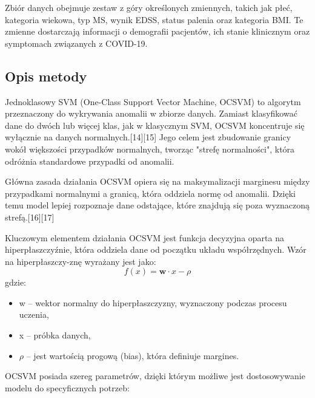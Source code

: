 \documentclass[a4paper,fleqn]{cas-dc}
\begin{document}
Zbiór danych obejmuje zestaw z góry określonych zmiennych, takich jak płeć, kategoria wiekowa, typ MS, wynik EDSS, status palenia oraz kategoria BMI. Te zmienne dostarczają informacji o demografii pacjentów, ich stanie klinicznym oraz symptomach związanych z COVID-19. 

\subsection{Opis metody}
Jednoklasowy SVM (One-Class Support Vector Machine, OCSVM) to algorytm przeznaczony do wykrywania anomalii w zbiorze danych. Zamiast klasyfikować dane do dwóch lub więcej klas, jak w klasycznym SVM, OCSVM koncentruje się wyłącznie na danych normalnych.[14][15] Jego celem jest zbudowanie granicy wokół większości przypadków normalnych, tworząc "strefę normalności", która odróżnia standardowe przypadki od anomalii.

Główna zasada działania OCSVM opiera się na maksymalizacji marginesu między przypadkami normalnymi a granicą, która oddziela normę od anomalii. Dzięki temu model lepiej rozpoznaje dane odstające, które znajdują się poza wyznaczoną strefą.[16][17]

Kluczowym elementem działania OCSVM jest funkcja decyzyjna oparta na hiperpłaszczyźnie, która oddziela dane od początku układu współrzędnych. Wzór na hiperpłaszczy-znę wyrażany jest jako:
\begin{equation}
    f(x) = \mathbf{w} \cdot x - \rho
\end{equation}
gdzie:
\begin{itemize}
\setlength\itemsep{0px}
    \item w – wektor normalny do hiperpłaszczyzny, wyznaczony podczas procesu uczenia,
    \item  x – próbka danych,
    \item  $\rho$ – jest wartością progową (bias), która definiuje margines.
\end{itemize}


\par OCSVM posiada szereg parametrów, dzięki którym możliwe jest dostosowywanie modelu do specyficznych potrzeb:
\end{document}

